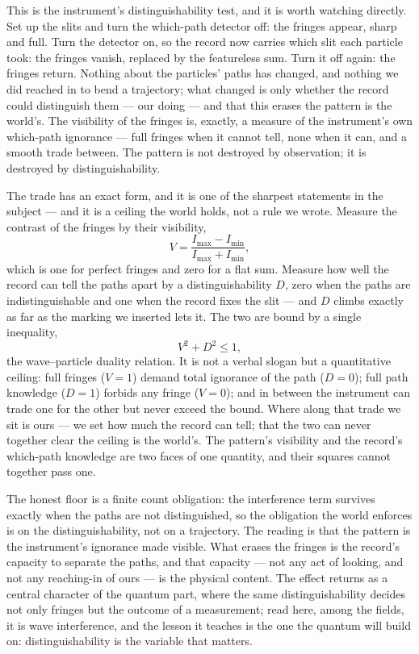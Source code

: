 This is the instrument's distinguishability test, and it is worth watching directly. Set up the slits and turn the which-path detector off: the fringes appear, sharp and
full. Turn the detector on, so the record now carries which slit each particle took: the fringes vanish,
replaced by the featureless sum. Turn it off again: the fringes return. Nothing about the particles' paths has
changed, and nothing we did reached in to bend a trajectory; what changed is only whether the record could
distinguish them --- our doing --- and that this erases the pattern is the world's. The visibility of the
fringes is, exactly, a measure of the instrument's own which-path ignorance --- full fringes when it cannot
tell, none when it can, and a smooth trade between. The pattern is not destroyed by observation; it is
destroyed by distinguishability.

The trade has an exact form, and it is one of the sharpest statements in the subject --- and it is a ceiling
the world holds, not a rule we wrote. Measure the contrast of the fringes by their visibility,
\begin{equation}
  V = \frac{I_{\max} - I_{\min}}{I_{\max} + I_{\min}},
\end{equation}
which is one for perfect fringes and zero for a flat sum. Measure how well the record can tell the paths apart
by a distinguishability $D$, zero when the paths are indistinguishable and one when the record fixes the slit
--- and $D$ climbs exactly as far as the marking we inserted lets it. The two are bound by a single
inequality,
\begin{equation}
  V^2 + D^2 \le 1,
\end{equation}
the wave--particle duality relation. It is not a verbal slogan but a quantitative ceiling: full fringes
($V = 1$) demand total ignorance of the path ($D = 0$); full path knowledge ($D = 1$) forbids any fringe
($V = 0$); and in between the instrument can trade one for the other but never exceed the bound. Where along
that trade we sit is ours --- we set how much the record can tell; that the two can never together clear the
ceiling is the world's. The pattern's visibility and the record's which-path knowledge are two faces of one
quantity, and their squares cannot together pass one.

The honest floor is a finite count obligation: the interference term survives exactly when the paths are not
distinguished, so the obligation the world enforces is on the distinguishability, not on a trajectory. The
reading is that the pattern is the instrument's ignorance made visible. What erases the fringes is the record's capacity to separate the paths, and that capacity ---
not any act of looking, and not any reaching-in of ours --- is the physical content. The effect returns as a
central character of the quantum part, where the same distinguishability decides not only fringes but the
outcome of a measurement; read here, among the fields, it is wave interference, and the lesson it teaches is
the one the quantum will build on: distinguishability is the variable that matters.


